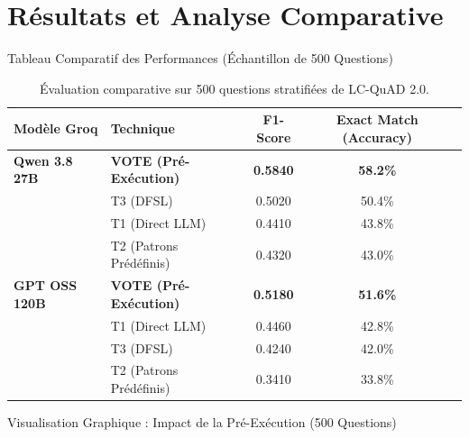 \documentclass[10pt,aspectratio=169]{beamer}
\begin{document}
\section{Résultats et Analyse Comparative}

\begin{frame}{Tableau Comparatif des Performances (Échantillon de 500 Questions)}
  \small
  \begin{table}[ht]
    \centering
    \begin{tabular}{llccc}
      \toprule
      \textbf{Modèle Groq} & \textbf{Technique} & \textbf{F1-Score} & \textbf{Exact Match (Accuracy)} \\
      \midrule
      \textbf{Qwen 3.8 27B} & \textbf{VOTE (Pré-Exécution)} & \textbf{0.5840} & \textbf{58.2\%} \\
       & T3 (DFSL) & 0.5020 & 50.4\% \\
       & T1 (Direct LLM) & 0.4410 & 43.8\% \\
       & T2 (Patrons Prédéfinis) & 0.4320 & 43.0\% \\
      \midrule
      \textbf{GPT OSS 120B} & \textbf{VOTE (Pré-Exécution)} & \textbf{0.5180} & \textbf{51.6\%} \\
       & T1 (Direct LLM) & 0.4460 & 42.8\% \\
       & T3 (DFSL) & 0.4240 & 42.0\% \\
       & T2 (Patrons Prédéfinis) & 0.3410 & 33.8\% \\
      \bottomrule
    \end{tabular}
    \caption{Évaluation comparative sur 500 questions stratifiées de LC-QuAD 2.0.}
  \end{table}
\end{frame}

\begin{frame}{Visualisation Graphique : Impact de la Pré-Exécution (500 Questions)}
  \centering
\end{frame}
\end{document}
